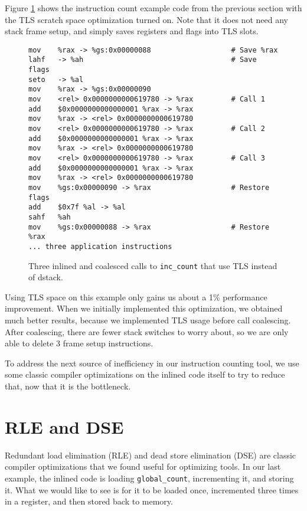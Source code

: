 Figure \ref{fig:inscount_tls} shows the instruction count example code from the
previous section with the TLS scratch space optimization turned on.  Note that
it does not need any stack frame setup, and simply saves registers and flags
into TLS slots.

\begin{figure}
\begin{verbatim}
mov    %rax -> %gs:0x00000088                   # Save %rax
lahf   -> %ah                                   # Save flags
seto   -> %al 
mov    %rax -> %gs:0x00000090 
mov    <rel> 0x0000000000619780 -> %rax         # Call 1
add    $0x0000000000000001 %rax -> %rax 
mov    %rax -> <rel> 0x0000000000619780 
mov    <rel> 0x0000000000619780 -> %rax         # Call 2
add    $0x0000000000000001 %rax -> %rax 
mov    %rax -> <rel> 0x0000000000619780 
mov    <rel> 0x0000000000619780 -> %rax         # Call 3
add    $0x0000000000000001 %rax -> %rax 
mov    %rax -> <rel> 0x0000000000619780 
mov    %gs:0x00000090 -> %rax                   # Restore flags
add    $0x7f %al -> %al 
sahf   %ah 
mov    %gs:0x00000088 -> %rax                   # Restore %rax
... three application instructions
\end{verbatim}
\caption{Three inlined and coalesced calls to {\tt inc\_count} that use TLS
instead of dstack.}
\label{fig:inscount_tls}
\end{figure}

Using TLS space on this example only gains us about a 1\% performance
improvement.  When we initially implemented this optimization, we obtained much
better results, because we implemented TLS usage before call coalescing.  After
coalescing, there are fewer stack switches to worry about, so we are only able
to delete 3 frame setup instructions.

To address the next source of inefficiency in our instruction counting tool, we
use some classic compiler optimizations on the inlined code itself to try to
reduce that, now that it is the bottleneck.

\section{RLE and DSE}

Redundant load elimination (RLE) and dead store elimination (DSE) are classic
compiler optimizations that we found useful for optimizing tools.  In our last
example, the inlined code is loading {\tt global\_count}, incrementing it, and
storing it.  What we would like to see is for it to be loaded once, incremented
three times in a register, and then stored back to memory.


